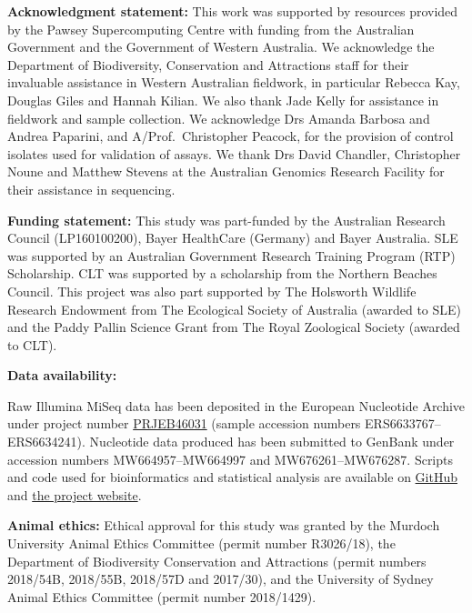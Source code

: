 \documentclass[a4paper, nobind]{templates/ociamthesis}
\begin{document}
\vspace{5mm}

\textbf{Acknowledgment statement:} This work was supported by resources provided by the Pawsey Supercomputing Centre with funding from the Australian Government and the Government of Western Australia.
We acknowledge the Department of Biodiversity, Conservation and Attractions staff for their invaluable assistance in Western Australian fieldwork, in particular Rebecca Kay, Douglas Giles and Hannah Kilian.
We also thank Jade Kelly for assistance in fieldwork and sample collection.
We acknowledge Drs Amanda Barbosa and Andrea Paparini, and A/Prof.~Christopher Peacock, for the provision of control isolates used for validation of assays.
We thank Drs David Chandler, Christopher Noune and Matthew Stevens at the Australian Genomics Research Facility for their assistance in sequencing.

\vspace{5mm}

\textbf{Funding statement:} This study was part-funded by the Australian Research Council (LP160100200), Bayer HealthCare (Germany) and Bayer Australia. SLE was supported by an Australian Government Research Training Program (RTP) Scholarship. CLT was supported by a scholarship from the Northern Beaches Council. This project was also part supported by The Holsworth Wildlife Research Endowment from The Ecological Society of Australia (awarded to SLE) and the Paddy Pallin Science Grant from The Royal Zoological Society (awarded to CLT).

\vspace{5mm}

\textbf{Data availability:}

Raw Illumina MiSeq data has been deposited in the European Nucleotide Archive under project number \href{https://www.ebi.ac.uk/ena/browser/view/PRJEB46031}{PRJEB46031} (sample accession numbers ERS6633767--ERS6634241). Nucleotide data produced has been submitted to GenBank under accession numbers MW664957--MW664997 and MW676261--MW676287. Scripts and code used for bioinformatics and statistical analysis are available on \href{https://github.com/siobhon-egan/wildlife-haemoprotozoa}{GitHub} and \href{https://siobhonlegan.com/wildlife-haemoprotozoa}{the project website}.

\vspace{5mm}

\textbf{Animal ethics:}
Ethical approval for this study was granted by the Murdoch University Animal Ethics Committee (permit number R3026/18), the Department of Biodiversity Conservation and Attractions (permit numbers 2018/54B, 2018/55B, 2018/57D and 2017/30), and the University of Sydney Animal Ethics Committee (permit number 2018/1429).
\end{document}
